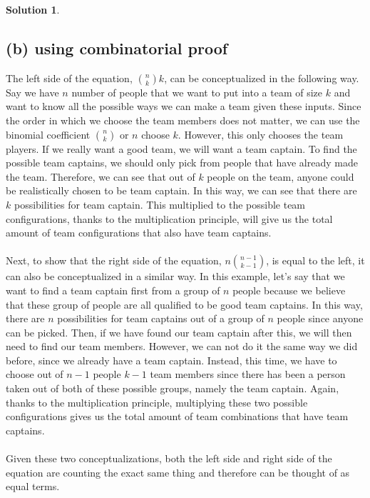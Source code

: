 \documentclass{article}
\theoremstyle{definition}
\newtheorem*{solution}{Solution}
\begin{document}
\begin{solution}
\subsection*{(b) using combinatorial proof}
The left side of the equation, $\binom{n}{k}k$, can be conceptualized in the following way. Say we have $n$ number of people that we want to put into a team of size $k$ and want to know all the possible ways we can make a team given these inputs. Since the order in which we choose the team members does not matter, we can use the binomial coefficient $\binom{n}{k}$ or $n$ choose $k$. However, this only chooses the team players. If we really want a good team, we will want a team captain. To find the possible team captains, we should only pick from people that have already made the team. Therefore, we can see that out of $k$ people on the team, anyone could be realistically chosen to be team captain. In this way, we can see that there are $k$ possibilities for team captain. This multiplied to the possible team configurations, thanks to the multiplication principle, will give us the total amount of team configurations that also have team captains.\\\\
Next, to show that the right side of the equation, $n \binom{n-1}{k-1} $, is equal to the left, it can also be conceptualized in a similar way. In this example, let's say that we want to find a team captain first from a group of $n$ people because we believe that these group of people are all qualified to be good team captains. In this way, there are $n$ possibilities for team captains out of a group of $n$ people since anyone can be picked. Then, if we have found our team captain after this, we will then need to find our team members. However, we can not do it the same way we did before, since we already have a team captain. Instead, this time, we have to choose out of $n-1$ people $k-1$ team members since there has been a person taken out of both of these possible groups, namely the team captain. Again, thanks to the multiplication principle, multiplying these two possible configurations gives us the total amount of team combinations that have team captains.\\\\
Given these two conceptualizations, both the left side and right side of the equation are counting the exact same thing and therefore can be thought of as equal terms.
\end{solution}
\end{document}
